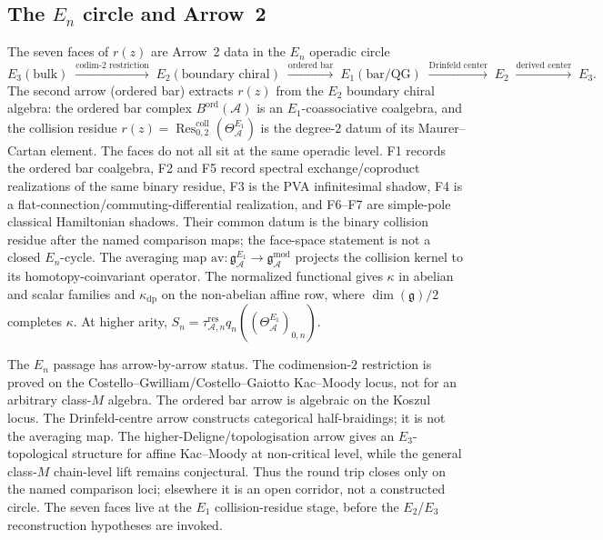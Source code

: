 \documentclass[11pt]{article}
\theoremstyle{plain}
\theoremstyle{definition}
\theoremstyle{remark}
\newcommand{\fg}{\mathfrak{g}}
\newcommand{\cA}{\mathcal{A}}
\newcommand{\Res}{\operatorname{Res}}
\begin{document}
\subsection{The $E_n$ circle and Arrow~2}\label{subsec:en-circle}

The seven faces of $r(z)$ are Arrow~2 data in the $E_n$ operadic
circle
\[
 E_3(\text{bulk})
 \;\xrightarrow{\text{codim-2 restriction}}\;
 E_2(\text{boundary chiral})
 \;\xrightarrow{\text{ordered bar}}\;
 E_1(\text{bar/QG})
 \;\xrightarrow{\text{Drinfeld center}}\;
 E_2
 \;\xrightarrow{\text{derived center}}\;
 E_3.
\]
The second arrow (ordered bar) extracts $r(z)$ from the $E_2$
boundary chiral algebra: the ordered bar complex
$B^{\mathrm{ord}}(\cA)$ is an $E_1$-coassociative coalgebra, and the
collision residue $r(z) = \Res^{\mathrm{coll}}_{0,2}(\Theta^{E_1}_\cA)$
is the degree-$2$ datum of its Maurer--Cartan element. The faces do
not all sit at the same operadic level. F1 records the ordered bar
coalgebra, F2 and F5 record spectral exchange/coproduct realizations
of the same binary residue, F3 is the PVA infinitesimal shadow, F4 is
a flat-connection/commuting-differential realization, and F6--F7 are
simple-pole classical Hamiltonian shadows. Their common datum is the
binary collision residue after the named comparison maps; the
face-space statement is not a closed $E_n$-cycle. The averaging map
$\mathrm{av}\colon\mathfrak{g}^{E_1}_\cA\to\mathfrak{g}^{\mathrm{mod}}_\cA$
projects the collision kernel to its homotopy-coinvariant operator.
The normalized functional gives $\kappa$ in abelian and scalar
families and $\kappa_{\mathrm{dp}}$ on the non-abelian affine row,
where $\dim(\fg)/2$ completes $\kappa$. At higher arity,
$S_n=\tau_{\cA,n}^{\mathrm{res}}q_n((\Theta_\cA^{E_1})_{0,n})$.

The $E_n$ passage has arrow-by-arrow status. The codimension-$2$
restriction is proved on the Costello--Gwilliam/Costello--Gaiotto
Kac--Moody locus, not for an arbitrary class-$M$ algebra. The ordered
bar arrow is algebraic on the Koszul locus. The Drinfeld-centre arrow
constructs categorical half-braidings; it is not the averaging map.
The higher-Deligne/topologisation arrow gives an $E_3$-topological
structure for affine Kac--Moody at non-critical level, while the
general class-$M$ chain-level lift remains conjectural. Thus the
round trip closes only on the named comparison loci; elsewhere it is
an open corridor, not a constructed circle. The seven faces live at
the $E_1$ collision-residue stage, before the $E_2$/$E_3$
reconstruction hypotheses are invoked.
\end{document}
